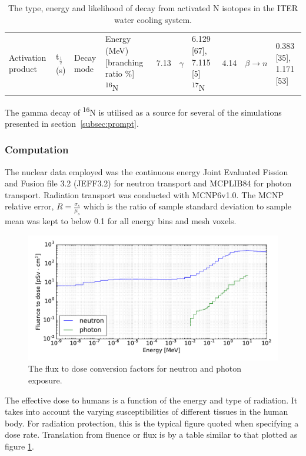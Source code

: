 \begin{table}[H]
  \centering
  \begin{tabu} to 0.5\textwidth {X[2] X X X[2]}
    \toprule
    Activation product  & t$_{\frac{1}{2}}$(s)  & Decay mode  & Energy (MeV) [branching ratio \%]
    \midrule
    \textsuperscript{16}N & 7.13  & $\gamma$              & 6.129 [67], 7.115 [5] 
    \textsuperscript{17}N & 4.14  & $\beta \rightarrow n$ & 0.383 [35], 1.171 [53]
    \bottomrule
  \end{tabu}
  \caption{The type, energy and likelihood of decay from activated N isotopes in the ITER water cooling system.}
  \label{tab:nitrogen_decay}
\end{table}

The gamma decay of \textsuperscript{16}N is utilised as a source for several of the simulations presented in section~\ref{subsec:prompt}.

\subsubsection{Computation}
The nuclear data employed was the continuous energy Joint Evaluated Fission and Fusion file 3.2 (JEFF3.2) for neutron transport and MCPLIB84 for photon transport. Radiation transport was conducted with MCNP6v1.0. The MCNP relative error, $R = \frac{\sigma_{s}}{\mu_{s}}$ which is the ratio of sample standard deviation to sample mean was kept to below 0.1 for all energy bins and mesh voxels.

\begin{figure}[H]
	\includegraphics[width=\textwidth]{icrp74}
	\caption{The flux to dose conversion factors for neutron and photon exposure.}
	\label{fig:icrp74}
\end{figure}

The effective dose to humans is a function of the energy and type of radiation. It takes into account the varying susceptibilities of different tissues in the human body. For radiation protection, this is the typical figure quoted when specifying a dose rate. Translation from fluence or flux is by a table similar to that plotted as figure \ref{fig:icrp74}.

